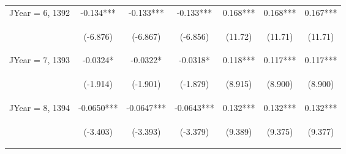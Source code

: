\documentclass[]{article}
\begin{document}
\begin{center}
\begin{tabular}{lcccccc}
JYear = 6, 1392 & -0.134*** & -0.133*** & -0.133*** & 0.168*** & 0.168*** & 0.167*** \\
\vspace{4pt} & \begin{footnotesize}(-6.876)\end{footnotesize} & \begin{footnotesize}(-6.867)\end{footnotesize} & \begin{footnotesize}(-6.856)\end{footnotesize} & \begin{footnotesize}(11.72)\end{footnotesize} & \begin{footnotesize}(11.71)\end{footnotesize} & \begin{footnotesize}(11.71)\end{footnotesize} \\
JYear = 7, 1393 & -0.0324* & -0.0322* & -0.0318* & 0.118*** & 0.117*** & 0.117*** \\
\vspace{4pt} & \begin{footnotesize}(-1.914)\end{footnotesize} & \begin{footnotesize}(-1.901)\end{footnotesize} & \begin{footnotesize}(-1.879)\end{footnotesize} & \begin{footnotesize}(8.915)\end{footnotesize} & \begin{footnotesize}(8.900)\end{footnotesize} & \begin{footnotesize}(8.900)\end{footnotesize} \\
JYear = 8, 1394 & -0.0650*** & -0.0647*** & -0.0643*** & 0.132*** & 0.132*** & 0.132*** \\
\vspace{4pt} & \begin{footnotesize}(-3.403)\end{footnotesize} & \begin{footnotesize}(-3.393)\end{footnotesize} & \begin{footnotesize}(-3.379)\end{footnotesize} & \begin{footnotesize}(9.389)\end{footnotesize} & \begin{footnotesize}(9.375)\end{footnotesize} & \begin{footnotesize}(9.377)\end{footnotesize} \\

\end{tabular}
\end{center}
\end{document}
